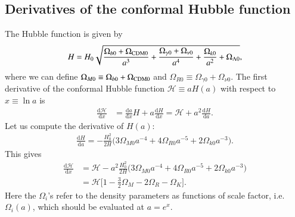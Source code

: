 \documentclass[twocolumn]{aa}
\renewcommand{\d}{\text{d}}
\newcommand{\dd}[2]{\frac{\d #1}{\d #2}}
\begin{document}
\begin{appendix}
\clearpage
\section{Derivatives of the conformal Hubble function}
\label{appendix:derivatives of Hp}
The Hubble function is given by
\begin{equation*}
H = H_0 \sqrt{\frac{\Omega_{b0}+\Omega_{\rm CDM 0}}{a^3} + \frac{\Omega_{\gamma 0}+\Omega_{\nu 0}}{a^4} + \frac{\Omega_{k0}}{a^2} + \Omega_{\Lambda 0}},
\end{equation*}
where we can define $\Omega_{M0}\equiv \Omega_{b0}+\Omega_{\rm CDM 0}$ and $\Omega_{R0}\equiv \Omega_{\gamma 0}+\Omega_{\nu 0}$. The first derivative of the conformal Hubble function $\mathcal{H}\equiv aH(a)$ with respect to $x\equiv\ln a$ is
\begin{align*}
      \dd{\mathcal{H}}{x} &= \dd{a}{x}H + a \dd{H}{x} = \mathcal{H} + a^2 \dd{H}{a}.
\end{align*}
Let us compute the derivative of $H(a)$:
\begin{align*}
      \dd{H}{a} = -\frac{H_0^2}{2H}\Big(3\Omega_{M0}a^{-4} + 4\Omega_{R 0} a^{-5} + 2\Omega_{k 0} a^{-3}\Big).
\end{align*}
This gives 
\begin{align*}
      \dd{\mathcal{H}}{x} &= \mathcal{H} - a^2 \frac{H_0^2}{2H}\Big(3\Omega_{M0}a^{-4} + 4\Omega_{R 0} a^{-5} + 2\Omega_{k 0} a^{-3} \Big)\\
      &= \mathcal{H}\bigg[1- \frac{3}{2}\Omega_{M} -2\Omega_{R} - \Omega_K\bigg].
\end{align*}
Here the $\Omega_i$'s refer to the density parameters as functions of scale factor, i.e. $\Omega_i(a)$, which should be evaluated at $a=e^x.$


\end{appendix}
\end{document}
